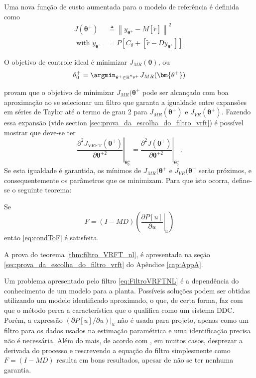 Uma nova função de custo aumentada para o modelo de referência é definida como
\begin{align}
   J\left(\bm{\theta}^+\right) &\triangleq \left\|y_{\bm{\theta}^+}-M[\tilde{r}]\right\|^{2} \\
   \text { with } y_{\bm{\theta}^+} &=P\left[C_{\theta}+\left[\tilde{r}-D y_{\bm{\theta}^+}\right]\right] .
\end{align}

O objetivo de controle ideal é minimizar $J_{MR}(\bm{\theta})$, ou
\begin{equation}
   \theta^+_0 = \argmin_{\theta^+ \in \mathbb{R}^{n_{\theta^+}}}{J_{MR}(\bm{\theta^+})}
\label{eq:argmqp}
\end{equation}

\cite{campi2006} provam que o objetivo de minimizar $J_{MR}(\bm{\theta^+}$ pode ser alcançado com boa aproximação ao se selecionar um filtro que garanta a igualdade entre expansões em séries de Taylor até o termo de grau 2 para $J_{MR}(\bm{\theta^+})$ e $J_{VR}(\bm{\theta}^+)$. Fazendo essa expansão (vide section \ref{sec:prova_da_escolha_do_filtro_vrft}) é possível mostrar que deve-se ter 
\begin{equation}
   \left.\frac{\partial^{2} J_{\mathrm{VRFT}}\left(\bm{\theta}^+\right)}{\partial \bm{\theta}^{+2}}\right|_{\bm{\theta}_{0}^{+}}=\left.\frac{\partial^{2} J\left(\bm{\theta}^+\right)}{\partial \bm{\theta}^{+2}}\right|_{\bm{\theta}_{0}^{+}}.
   \label{eq:condToF}
\end{equation}
Se esta igualdade é garantida, os mínimos de $J_{MR}(\bm{\theta^+}$ e $J_{VR}(\bm{\theta^+}$ serão próximos, e consequentemente os parâmetros que os minimizam. Para que isto ocorra, define-se o seguinte teorema:
\begin{thm} \label{thm:filtro_VRFT_nl}
   Se 
   \begin{equation}
       F=(I-M D)\left(\left.\frac{\partial P[u]}{\partial u}\right|_{\tilde{u}}\right)
       \label{eq:FiltroVRFTNL}
   \end{equation}
   então \eqref{eq:condToF} é satisfeita.
\end{thm}

A prova do teorema \ref{thm:filtro_VRFT_nl}, é apresentada na seção \ref{sec:prova_da_escolha_do_filtro_vrft} do Apêndice \ref{cap:AppA}.

Um problema apresentado pelo filtro \eqref{eq:FiltroVRFTNL} é a dependência do conhecimento de um modelo para a planta. Possíveis soluções podem ser obtidas utilizando um modelo identificado aproximado, o que, de certa forma, faz com que o método perca a característica que o qualifica como um sistema DDC. Porém, a expressão $\left.(\partial P[u]/\partial u)\right|_{\tilde{u}}$ não é usada para projeto, apenas como um filtro para os dados usados na estimação paramétrica e uma identificação precisa não é necessária.
Além do mais, de acordo com \cite{campi2006}, em muitos casos, desprezar a derivada do processo e rescrevendo a equação do filtro simplesmente como $F=(I-MD)$ resulta em bons resultados, apesar de não se ter nenhuma garantia.
   
